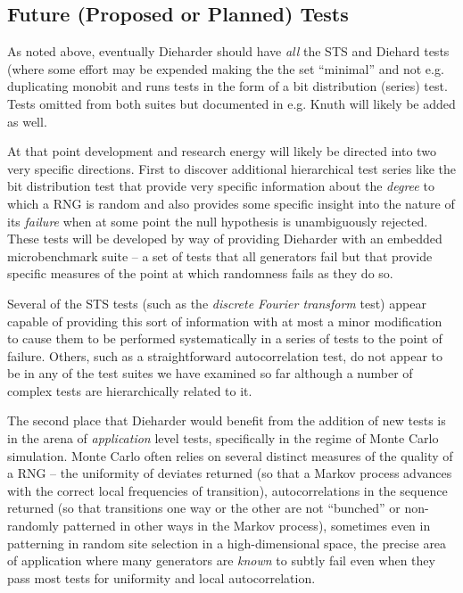 \documentclass[12pt]{article}
\begin{document}
\subsection{Future (Proposed or Planned) Tests}

As noted above, eventually Dieharder should have {\em all} the STS and
Diehard tests (where some effort may be expended making the the set
``minimal'' and not e.g. duplicating monobit and runs tests in the form
of a bit distribution (series) test.  Tests omitted from both suites but
documented in e.g. Knuth will likely be added as well.

At that point development and research energy will likely be directed
into two very specific directions.  First to discover additional
hierarchical test series like the bit distribution test that provide
very specific information about the {\em degree} to which a RNG is
random and also provides some specific insight into the nature of its
{\em failure} when at some point the null hypothesis is unambiguously
rejected.  These tests will be developed by way of providing Dieharder
with an embedded microbenchmark suite -- a set of tests that all
generators fail but that provide specific measures of the point at which
randomness fails as they do so.  

Several of the STS tests (such as the {\em discrete Fourier transform}
test) appear capable of providing this sort of information with at most
a minor modification to cause them to be performed systematically in a
series of tests to the point of failure.  Others, such as a
straightforward autocorrelation test, do not appear to be in any of the
test suites we have examined so far although a number of complex tests
are hierarchically related to it.

The second place that Dieharder would benefit from the addition of new
tests is in the arena of {\em application} level tests, specifically in
the regime of Monte Carlo simulation.  Monte Carlo often relies on
several distinct measures of the quality of a RNG -- the uniformity of
deviates returned (so that a Markov process advances with the correct
local frequencies of transition), autocorrelations in the sequence
returned (so that transitions one way or the other are not ``bunched''
or non-randomly patterned in other ways in the Markov process),
sometimes even in patterning in random site selection in a
high-dimensional space, the precise area of application where many
generators are {\em known} to subtly fail even when they pass most tests
for uniformity and local autocorrelation.  
\end{document}
